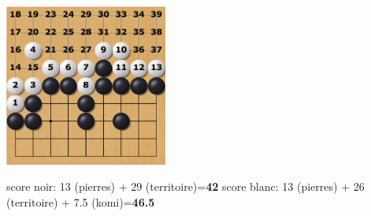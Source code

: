 \documentclass[compress, color = usenames, dvipsnames]{beamer}
\begin{document}
{\begin{center}
       { \includegraphics[width=0.4\textwidth]{figs/gorule_score5.png} }
  \end{center}
   {score noir: 13 (pierres) + 29 (territoire)=\textbf{42}}
   {score blanc: 13 (pierres) + 26 (territoire) + 7.5 (komi)=\textbf{46.5}}

}
\end{document}
